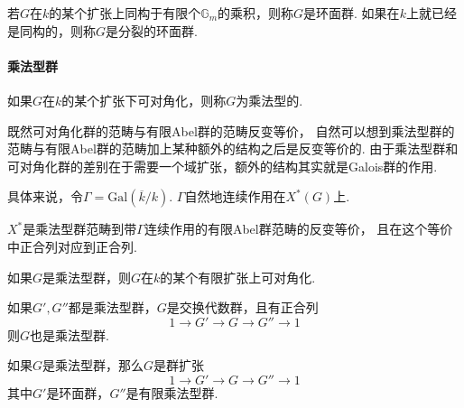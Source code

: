\begin{cdef}
    若$G$在$k$的某个扩张上同构于有限个$\mathbb{G}_m$的乘积，则称$G$是环面群. 如果在$k$上就已经是同构的，则称$G$是分裂的环面群.
\end{cdef}

\paragraph*{乘法型群}

\begin{cdef}
    如果$G$在$k$的某个扩张下可对角化，则称$G$为乘法型的.
\end{cdef}

既然可对角化群的范畴与有限Abel群的范畴反变等价，
自然可以想到乘法型群的范畴与有限Abel群的范畴加上某种额外的结构之后是反变等价的.
由于乘法型群和可对角化群的差别在于需要一个域扩张，额外的结构其实就是Galois群的作用.

具体来说，令$\Gamma = \mathrm{Gal}(\overline{k}/k)$.
$\Gamma$自然地连续作用在$X^{*}(G)$上.
\begin{cprop}
    $X^{*}$是乘法型群范畴到带$\Gamma$连续作用的有限Abel群范畴的反变等价，
    且在这个等价中正合列对应到正合列.
\end{cprop}

\begin{cprop}
    如果$G$是乘法型群，则$G$在$k$的某个有限扩张上可对角化.
\end{cprop}

\begin{cprop}
    如果$G',G''$都是乘法型群，$G$是交换代数群，且有正合列
    \begin{equation}
        1\to G'\to G\to G''\to 1
    \end{equation}
    则$G$也是乘法型群.
\end{cprop}


\begin{cprop}
    如果$G$是乘法型群，那么$G$是群扩张
    \begin{equation}
        1\to G'\to G\to G''\to 1
    \end{equation}
    其中$G'$是环面群，$G''$是有限乘法型群.
\end{cprop}

